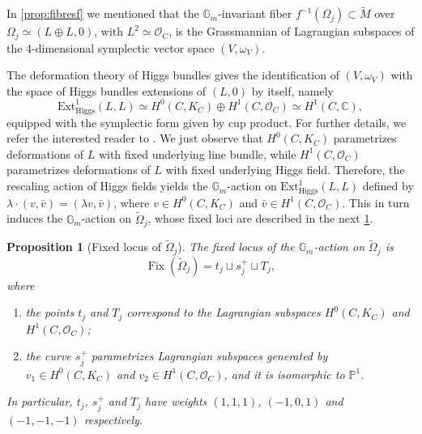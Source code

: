 \documentclass[JEP,XML,SOM,Unicode, NoEqCountersInSection,NoFloatCountersInSection,published]{cedram}
\let\mathcal\mathscr
\newtheorem{prop}[thm]{Proposition}
\theoremstyle{definition}
\newcommand{\Gm}{\mathbb{G}_m}
\newcommand{\CC}{\mathbb{C}}
\newcommand{\PP}{\mathbb{P}}
\newcommand{\Fix}{\operatorname{Fix}}
\newcommand{\tomega}{\widetilde{\Omega}}
\begin{document}
In \cref{prop:fibresf} we mentioned that the $\Gm$\nobreakdash-invariant fiber $f^{-1}(\Omega_j) \subset \widetilde{M}$ over $\Omega_j \simeq (L \oplus L, 0)$, with $L^2 \simeq \mathcal{O}_C$, is the Grassmannian of Lagrangian subspaces of the 4-dimensional symplectic vector space $(V, \omega_V)$.

The deformation theory of Higgs bundles gives the identification of $(V, \omega_V)$ with the space of Higgs bundles extensions of $(L,0)$ by itself, namely
\[
\mathrm{Ext}^1_{\mathrm{Higgs}}(L,L)\simeq H^0(C, K_C) \oplus H^1(C, \mathcal{O}_C) \simeq H^1(C, \CC),
\]
equipped with the symplectic form given by cup product. For further details, we refer the interested reader to \cite[\S 3.2.2]{Felisetti2018}. We just observe that $H^0(C, K_C)$ parametrizes deformations of $L$ with fixed underlying line bundle, while $H^1(C, \mathcal{O}_C)$ parametrizes deformations of $L$ with fixed underlying Higgs field. Therefore, the rescaling action of Higgs fields yields the $\Gm$\nobreakdash-action on $\mathrm{Ext}^1_{\mathrm{Higgs}}(L,L)$ defined by
$\lambda \cdot (v,\bar{v})=(\lambda v, \bar{v})$, where $v \in H^0(C, K_C)$ and $\bar{v} \in H^1(C, \mathcal{O}_C)$. This in turn induces the $\Gm$\nobreakdash-action on $\tomega_j$, whose fixed loci are described in the next \cref{prop:fixedlocusG}.
\begin{prop}[Fixed locus of $\tomega_j$] \label{prop:fixedlocusG}
The fixed locus of the $\Gm$\nobreakdash-action on $\tomega_j$ is
\[
\Fix(\tomega_j)= t_j \sqcup s^+_j \sqcup T_j,
\]
where
\begin{enumerate}
\item the points $t_j$ and $T_j$ correspond to the Lagrangian subspaces $H^0(C, K_C)$ and $H^1(C, \mathcal{O}_C)$;
\item the curve $s^+_j$ parametrizes Lagrangian subspaces generated by $v_1 \in H^0(C, K_C)$ and $v_2 \in H^1(C, \mathcal{O}_C)$, and it is isomorphic to $\PP^1$.
\end{enumerate}
In particular, $t_j$, $s^+_j$ and $T_j$ have weights $(1,1,1)$, $(-1,0,1)$ and $(-1,-1,-1)$ respectively.
\end{prop}
\end{document}
